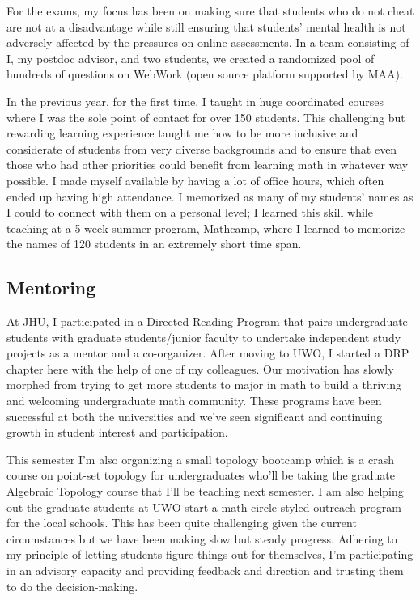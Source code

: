   For the exams, my focus has been on making sure that students who do not cheat are not at a disadvantage while still ensuring that students' mental health is not adversely affected by the pressures on online assessments.
  In a team consisting of I, my postdoc advisor, and two students, we created a randomized pool of hundreds of questions on WebWork (open source platform supported by MAA).

  In the previous year, for the first time, I taught in huge coordinated courses where I was the sole point of contact for over 150 students.
  This challenging but rewarding learning experience taught me how to be more inclusive and considerate of students from very diverse backgrounds and to ensure that even those who had other priorities could benefit from learning math in whatever way possible.
  I made myself available by having a lot of office hours, which often ended up having high attendance.
  I memorized as many of my students' names as I could to connect with them on a personal level;
  I learned this skill while teaching at a 5 week summer program, Mathcamp, where I learned to memorize the names of 120 students in an extremely short time span.
 
\subsection*{Mentoring}
  At JHU, I participated in a Directed Reading Program that pairs undergraduate students with graduate students/junior faculty to undertake independent study projects as a mentor and a co-organizer. 
  After moving to UWO, I started a DRP chapter here with the help of one of my colleagues. 
  Our motivation has slowly morphed from trying to get more students to major in math to build a thriving and welcoming undergraduate math community.
  These programs have been successful at both the universities and we've seen significant and continuing growth in student interest and participation.
  
  \newpage
  This semester I'm also organizing a small topology bootcamp which is a crash course on point-set topology for undergraduates who'll be taking the graduate Algebraic Topology course that I'll be teaching next semester. I am also helping out the graduate students at UWO start a math circle styled outreach program for the local schools. This has been quite challenging given the current circumstances but we have been making slow but steady progress. Adhering to my principle of letting students figure things out for themselves, I'm participating in an advisory capacity and providing feedback and direction and trusting them to do the decision-making.

